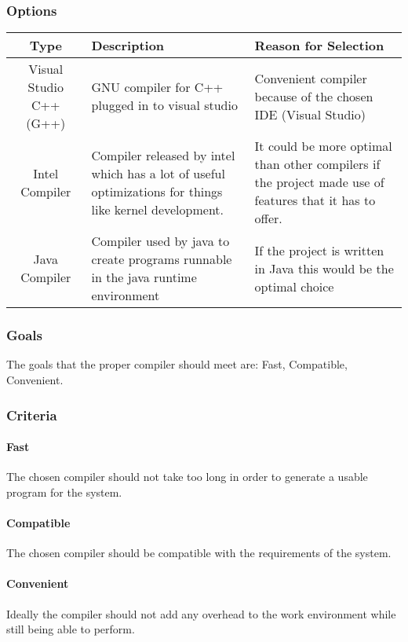 \subsubsection{Options}
\begin{center}
	\begin{tabular}{ ||C|L|L|| } 
		\hline
		Type & Description & Reason for Selection \\
		\hline
		Visual Studio C++ (G++) & GNU compiler for C++ plugged in to visual studio & Convenient compiler because of the chosen IDE (Visual Studio) \\ 
		\hline
		Intel Compiler & Compiler released by intel which has a lot of useful optimizations for things like kernel development. & It could be more optimal than other compilers if the project made use of features that it has to offer. \\ 
		\hline
		Java Compiler & Compiler used by java to create programs runnable in the java runtime environment & If the project is written in Java this would be the optimal choice \\ 
		\hline
	\end{tabular}
\end{center}
\subsubsection{Goals}
The goals that the proper compiler should meet are: Fast, Compatible, Convenient.
\subsubsection{Criteria}
\paragraph{Fast}
The chosen compiler should not take too long in order to generate a usable program for the system.
\paragraph{Compatible}
The chosen compiler should be compatible with the requirements of the system.
\paragraph{Convenient}
Ideally the compiler should not add any overhead to the work environment while still being able to perform.
